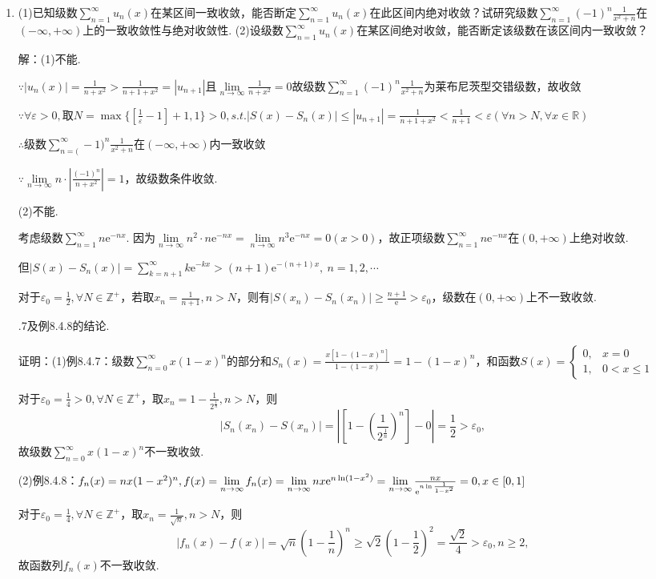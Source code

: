 \documentclass[12pt,UTF8]{ctexart}
\newcommand\Lim[0]{\lim\limits_{n\rightarrow\infty}}
\newcommand\Ser[1]{\sum_{n=#1}^\infty}
\begin{document}
\begin{enumerate}
\item(1)已知级数$\Ser{1}u_n(x)$在某区间一致收敛，能否断定$\Ser{1}u_n(x)$在此区间内绝对收敛？试研究级数$\Ser{1}(-1)^n\frac1{x^2+n}$在$(-\infty,+\infty)$上的一致收敛性与绝对收敛性.
\newline
(2)设级数$\Ser{1}u_n(x)$在某区间绝对收敛，能否断定该级数在该区间内一致收敛？

解：(1)不能. 

$\because|u_n(x)|=\frac1{n+x^2}>\frac1{n+1+x^2}=|u_{n+1}|$且$\Lim\frac1{n+x^2}=0$故级数$\Ser{1}(-1)^n\frac1{x^2+n}$为莱布尼茨型交错级数，故收敛

$\because\forall\varepsilon>0,\text{取}N=\max\{[\frac1\varepsilon-1]+1,1\}>0,s.t.|S(x)-S_n(x)|\leq|u_{n+1}|=\frac1{n+1+x^2}<\frac1{n+1}<\varepsilon(\forall n>N,\forall x\in\mathbb R)$

$\therefore$级数$\Ser(-1)^n\frac1{x^2+n}$在$(-\infty,+\infty)$内一致收敛

$\because\Lim n\cdot|\frac{(-1)^n}{n+x^2}|=1$，故级数条件收敛.

(2)不能.

考虑级数$\Ser{1}n\mathrm e^{-nx}$. 因为$\Lim n^2\cdot n\mathrm e^{-nx}=\Lim n^3\mathrm e^{-nx}=0(x>0)$，故正项级数$\Ser{1}n\mathrm e^{-nx}$在$(0,+\infty)$上绝对收敛. 

但$|S(x)-S_n(x)|=\sum_{k=n+1}^\infty k\mathrm e^{-kx}>(n+1)\mathrm e^{-(n+1)x},\ n=1,2,\cdots$

对于$\varepsilon_0=\frac12,\forall N\in\mathbb Z^+$，若取$x_n=\frac1{n+1},n>N$，则有$|S(x_n)-S_n(x_n)|\geq\frac{n+1}{\mathrm e}>\varepsilon_0$，级数在$(0,+\infty)$上不一致收敛.

.7及例8.4.8的结论.

证明：(1)例8.4.7：级数$\Ser{0}x(1-x)^n$的部分和$S_n(x)=\frac{x[1-(1-x)^n]}{1-(1-x)}=1-(1-x)^n$，和函数$S(x)=\begin{cases}
0,&x=0\\
1,&0<x\leq1
\end{cases}$

对于$\varepsilon_0=\frac14>0,\forall N\in\mathbb Z^+$，取$x_n=1-\frac1{2^{\frac1n}},n>N$，则
\[|S_n(x_n)-S(x_n)|=|[1-(\frac1{2^{\frac1n}})^n]-0|=\frac12>\varepsilon_0,\]
故级数$\Ser{0}x(1-x)^n$不一致收敛.

(2)例8.4.8：$f_n(x)=nx(1-x^2)^n,f(x)=\Lim f_n(x)=\Lim nx\mathrm e^{n\ln(1-x^2)}=\Lim \frac{nx}{\mathrm e^{n\ln\frac1{1-x^2}}}\\
=0,x\in[0,1]$

对于$\varepsilon_0=\frac14,\forall N\in\mathbb Z^+$，取$x_n=\frac1{\sqrt n},n>N$，则
\[|f_n(x)-f(x)|=\sqrt n(1-\frac1n)^n\geq\sqrt2(1-\frac12)^2=\frac{\sqrt2}4>\varepsilon_0,n\geq2,\]
故函数列$f_n(x)$不一致收敛.
\end{enumerate}
\end{document}
